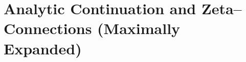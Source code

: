 
\section{Analytic Continuation and Zeta–Connections (Maximally Expanded)}
\label{sec:analytic-zeta-expanded}

